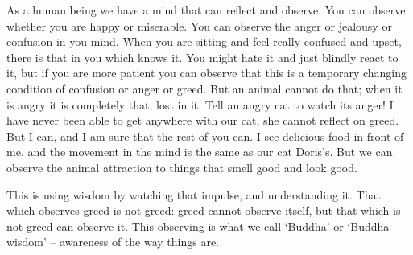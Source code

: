 As a human being we have a mind that can reflect and observe. You can observe whether you are happy or miserable. You can observe the anger or jealousy or confusion in you mind. When you are sitting and feel really confused and upset, there is that in you which knows it. You might hate it and just blindly react to it, but if you are more patient you can observe that this is a temporary changing condition of confusion or anger or greed. But an animal cannot do that; when it is angry it is completely that, lost in it. Tell an angry cat to watch its anger! I have never been able to get anywhere with our cat, she cannot reflect on greed. But I can, and I am sure that the rest of you can. I see delicious food in front of me, and the movement in the mind is the same as our cat Doris's. But we can observe the animal attraction to things that smell good and look good.

This is using wisdom by watching that impulse, and understanding it. That which observes greed is not greed: greed cannot observe itself, but that which is not greed can observe it. This observing is what we call `Buddha' or `Buddha wisdom' -- awareness of the way things are.
